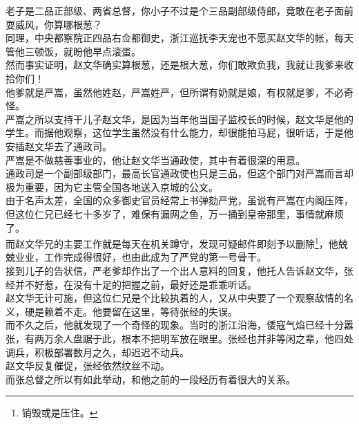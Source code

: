\begin{multicols}{\theparacolNo}
老子是二品正部级、两省总督，你小子不过是个三品副部级侍郎，竟敢在老子面前耍威风，你算哪根葱？\\

同理，中央都察院正四品右佥都御史，浙江巡抚李天宠也不愿买赵文华的帐，每天管他三顿饭，就盼他早点滚蛋。\\

然而事实证明，赵文华确实算根葱，还是根大葱，你们敢欺负我，我就让我爹来收拾你们！\\

他爹就是严嵩，虽然他姓赵，严嵩姓严，但所谓有奶就是娘，有权就是爹，不必奇怪。\\

严嵩之所以支持干儿子赵文华，是因为当年他当国子监校长的时候，赵文华是他的学生。而据他观察，这位学生虽然没有什么能力，却很能拍马屁，很听话，于是他安插赵文华去了通政司。\\

严嵩是不做慈善事业的，他让赵文华当通政使，其中有着很深的用意。\\

通政司是一个副部级部门，最高长官通政使也只是三品，但这个部门对严嵩而言却极为重要，因为它主管全国各地送入京城的公文。\\

由于名声太差，全国的众多御史官员经常上书弹劾严党，虽说有严嵩在内阁压阵，但这位仁兄已经七十多岁了，难保有漏网之鱼，万一捅到皇帝那里，事情就麻烦了。\\

而赵文华兄的主要工作就是每天在机关蹲守，发现可疑邮件即刻予以删除\footnote{销毁或是压住。}，他兢兢业业，工作完成得很好，也由此成为了严党的第一号骨干。\\

接到儿子的告状信，严老爹却作出了一个出人意料的回复，他托人告诉赵文华，张经并不好惹，在没有十足的把握之前，最好还是乖乖听话。\\

赵文华无计可施，但这位仁兄是个比较执着的人，又从中央要了一个观察敌情的名义，硬是赖着不走。他要留在这里，等待张经的失误。\\

而不久之后，他就发现了一个奇怪的现象。当时的浙江沿海，倭寇气焰已经十分嚣张，有两万余人盘踞于此，根本不把明军放在眼里。张经也并非等闲之辈，他四处调兵，积极部署数月之久，却迟迟不动兵。\\

赵文华反复催促，张经依然纹丝不动。\\

而张总督之所以有如此举动，和他之前的一段经历有着很大的关系。\\


\end{multicols}
